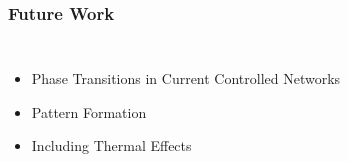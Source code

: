 \documentclass[mathserif]{beamer}
\begin{document}
\begin{frame}
\frametitle{Future Work}
\begin{columns}
\begin{itemize}
\item<1-> Phase Transitions in Current Controlled Networks
\item<2-> Pattern Formation
\item<3-> Including Thermal Effects
\end{itemize}
\begin{center}



\end{center}
\end{columns}
\end{frame}
\end{document}
